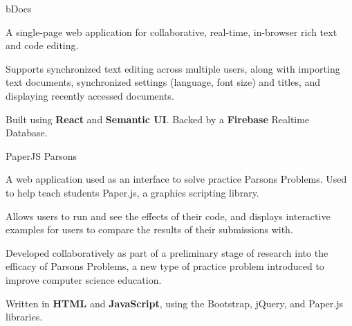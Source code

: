 

\begin{cventries}

  \cventry
    {} %
    {bDocs} %
    {} %
    {} %
    {
      \vspace{-9mm}
      \begin{cvprojectitems}
        \item A single-page web application for collaborative, real-time, in-browser rich text and code editing.
        \item Supports synchronized text editing across multiple users, along with importing text documents, synchronized settings 
        (language, font size) and titles, and displaying recently accessed documents.
        \item Built using \textbf{React} and \textbf{Semantic UI}. Backed by a \textbf{Firebase} Realtime Database. 
      \end{cvprojectitems}
    }

  \vspace{-3mm}
  \cventry
    {} %
    {PaperJS Parsons} %
    {} %
    {} %
    {
      \begin{cvprojectitems}
        \vspace{-9mm}
        \item A web application used as an interface to solve practice Parsons Problems. Used to help teach students 
        Paper.js, a graphics scripting library.
        \item Allows users to run and see the effects of their code, and displays interactive examples 
        for users to compare the results of their submissions with.
        \item Developed collaboratively as part of a preliminary stage of research into the efficacy of Parsons Problems, 
        a new type of practice problem introduced to improve computer science education.
        \item Written in \textbf{HTML} and \textbf{JavaScript}, using the Bootstrap, jQuery, and Paper.js libraries.
      \end{cvprojectitems}
    }
\end{cventries}
